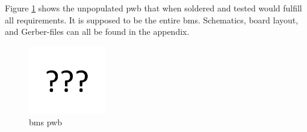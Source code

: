Figure \ref{fig:bmspwb} shows the unpopulated \gls{pwb} that when soldered and tested would fulfill all requirements. It is supposed to be the entire \gls{bms}. 
Schematics, board layout, and Gerber-files can all be found in the appendix. %

\begin{figure}[H]
	\centering
	\includegraphics[width=0.3\textwidth]{Figures/missing.png} %
	\caption{\gls{bms} \gls{pwb}}
	\label{fig:bmspwb}
\end{figure}